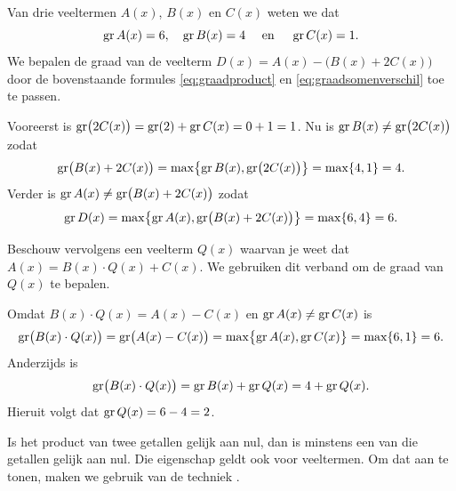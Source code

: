 \documentclass{ximera}
\begin{document}
\begin{example}
Van drie veeltermen $A(x)$, $B(x)$ en $C(x)$ weten we dat
\[
\operatorname{gr} A(x) = 6, \quad \operatorname{gr} B(x) = 4 \quad \text{ en } \quad \operatorname{gr} C(x) = 1.
\]
We bepalen de graad van de veelterm $D(x) = A(x) - \bigl(B(x) + 2C(x)\bigr)$ door de bovenstaande formules \eqref{eq:graadproduct} en \eqref{eq:graadsomenverschil} toe te passen. 

Vooreerst is $\operatorname{gr}\bigl(2C(x)\bigr) = \operatorname{gr}(2) + \operatorname{gr} C(x) = 0 + 1 = 1$. Nu is $\operatorname{gr} B(x) \neq \operatorname{gr}\bigl(2C(x)\bigr)$ zodat
\[
\operatorname{gr} \bigl(B(x) + 2C(x)\bigr) = \max \bigl\{\operatorname{gr} B(x),\operatorname{gr}\bigl(2C(x)\bigr)\bigr\} = \max\{4,1\} = 4.
\]
Verder is $\operatorname{gr} A(x) \neq \operatorname{gr}\bigl(B(x) + 2C(x)\bigr)$ zodat 
\[
\operatorname{gr} D(x) = \max \bigl\{\operatorname{gr} A(x),\operatorname{gr}\bigl(B(x) + 2C(x)\bigr)\bigr\} = \max\{6,4\} = 6.
\]

Beschouw vervolgens een veelterm $Q(x)$ waarvan je weet dat $A(x) = B(x)\cdot Q(x) + C(x)$. We gebruiken dit verband om de graad van $Q(x)$ te bepalen. 

Omdat $B(x)\cdot Q(x) = A(x) - C(x)$ en $\operatorname{gr} A(x) \neq \operatorname{gr} C(x)$ is
\[
\operatorname{gr}\bigl(B(x)\cdot Q(x)\bigr) = \operatorname{gr}\bigl(A(x) - C(x)\bigr) = \max \bigl\{\operatorname{gr} A(x),\operatorname{gr} C(x)\bigr\} = \max\{6,1\} = 6.
\]
Anderzijds is 
\[
\operatorname{gr}\bigl(B(x)\cdot Q(x)\bigr) = \operatorname{gr} B(x) + \operatorname{gr} Q(x) = 4 + \operatorname{gr} Q(x).
\]
Hieruit volgt dat $\operatorname{gr} Q(x) = 6-4 = 2$. 
\end{example}

Is het product van twee getallen gelijk aan nul, dan is minstens een van die getallen gelijk aan nul. Die eigenschap geldt ook voor veeltermen. Om dat aan te tonen, maken we gebruik van de techniek . 
 
\end{document}
